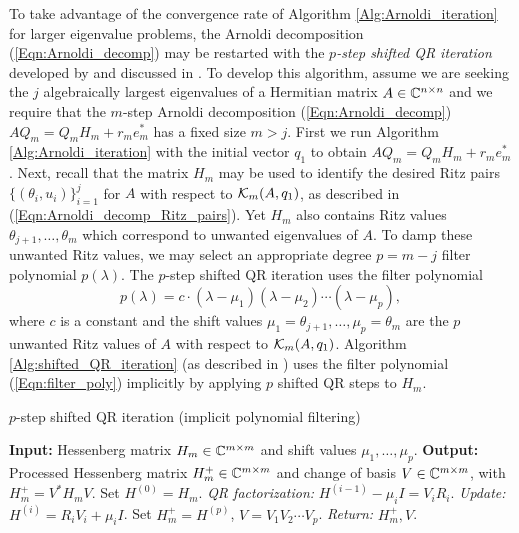 To take advantage of the convergence rate of Algorithm \ref{Alg:Arnoldi_iteration} for larger eigenvalue problems, the Arnoldi decomposition (\ref{Eqn:Arnoldi_decomp}) may be restarted with the \textit{$p$-step shifted QR iteration} developed by \cite{sorensen1992implicit} and discussed in \cite[Sections 10.5.2-3]{golub2012matrix}.  To develop this algorithm, assume we are seeking the $j$ algebraically largest eigenvalues of a Hermitian matrix $A \in {\mathbb C}^{n \times n}$ and we require that the $m$-step Arnoldi decomposition (\ref{Eqn:Arnoldi_decomp}) $AQ_m = Q_m H_m + r_m e_m^*$ has a fixed size $m > j$.  First we run Algorithm \ref{Alg:Arnoldi_iteration} with the initial vector $q_1$ to obtain $AQ_m = Q_m H_m + r_m e_m^*$.  Next, recall that the matrix $H_m$ may be used to identify the desired Ritz pairs $\{(\theta_i, u_i)\}_{i=1}^j$ for $A$ with respect to ${\mathcal K}_m(A, q_1)$, as described in (\ref{Eqn:Arnoldi_decomp_Ritz_pairs}).  Yet $H_m$ also contains Ritz values $\theta_{j+1}, \ldots, \theta_m$ which correspond to unwanted eigenvalues of $A$.  To damp these unwanted Ritz values, we may select an appropriate degree $p = m-j$ filter polynomial $p(\lambda)$.  The $p$-step shifted QR iteration uses the filter polynomial
\begin{equation} 			\label{Eqn:filter_poly}
p(\lambda) = c \cdot (\lambda - \mu_1) (\lambda - \mu_2) \cdots (\lambda - \mu_p),
\end{equation}
where $c$ is a constant and the shift values $\mu_1 = \theta_{j+1}, \ldots, \mu_p = \theta_m$ are the $p$ unwanted Ritz values of $A$ with respect to ${\mathcal K}_m(A, q_1)$.  Algorithm \ref{Alg:shifted_QR_iteration} (as described in \cite[Section 10.5.3]{golub2012matrix}) uses the filter polynomial (\ref{Eqn:filter_poly}) implicitly by applying $p$ shifted QR steps to $H_m$.
\begin{algorithm}[H]
\caption{$p$-step shifted QR iteration (implicit polynomial filtering)}	\label{Alg:shifted_QR_iteration}

\begin{algorithmic}[1]
	\Statex 	\textbf{Input:} Hessenberg matrix $H_m \in {\mathbb C}^{m \times m}$ and shift values $\mu_1, \ldots, \mu_p$.
	\Statex 	\textbf{Output:} Processed Hessenberg matrix $H_m^+ \in {\mathbb C}^{m \times m}$ and change of basis $V \in {\mathbb C}^{m \times m}$, with $H_m^+ = V^*H_mV$.
	\State		Set $H^{(0)} = H_m$.
		\State		\textit{QR factorization:} $H^{(i-1)} - \mu_i I = V_iR_i$.
		\State		\textit{Update:} $H^{(i)} = R_iV_i + \mu_iI$.
	\EndFor
	\State		Set $H_m^+ = H^{(p)}$, $V = V_1  V_2 \cdots V_p$.
	\State		\textit{Return:} $H_m^+, V$.
\end{algorithmic}

\end{algorithm}

